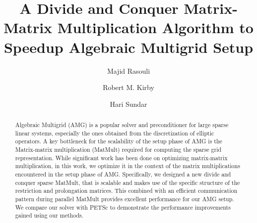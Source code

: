 \documentclass[sigconf]{acmart}
\begin{document}
%
\title[Divide and Conquer Matrix-Matrix Multiplication]{A Divide and Conquer Matrix-Matrix Multiplication Algorithm to Speedup Algebraic Multigrid Setup}

%
\author{Majid Rasouli}

\author{Robert M. Kirby}

\author{Hari Sundar}


\begin{abstract}
Algebraic Multigrid (AMG) is a popular solver and preconditioner for large sparse linear systems, especially the ones obtained from the discretization of elliptic operators.
A key bottleneck for the scalability of the setup phase of AMG is the Matrix-matrix multiplication (MatMult) required for computing the sparse grid representation. While significant work has been done on optimizing matrix-matrix multiplication, in this work, we optimize it in the context of the matrix multiplications encountered in the setup phase of AMG. Specifically, we designed a new divide and conquer sparse MatMult, that is scalable and makes use of the specific structure of the restriction and prolongation matrices. This combined with an efficient communication pattern during parallel MatMult provides excellent performance for our AMG setup. We compare our solver with PETSc to demonstrate the performance improvements gained using our methods.
\end{abstract}
\end{document}
